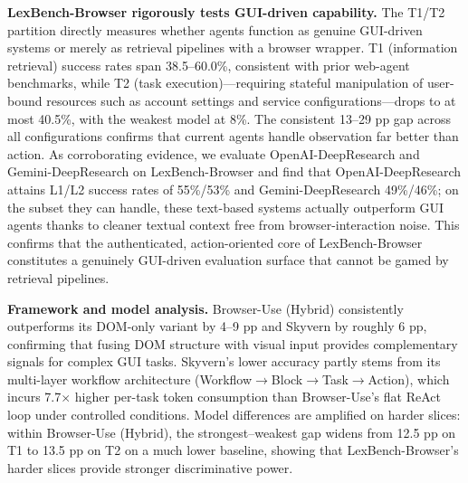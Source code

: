 
\noindent \textbf{LexBench-Browser rigorously tests GUI-driven capability.} The
  T1/T2 partition directly measures whether agents function as
  genuine GUI-driven systems or merely as retrieval pipelines with
  a browser wrapper. T1 (information retrieval) success rates
  span 38.5--60.0\%, consistent with prior web-agent benchmarks,
  while T2 (task execution)---requiring stateful manipulation of
  user-bound resources such as account settings and service
  configurations---drops to at most 40.5\%, with the weakest model at
  8\%. The consistent 13--29 pp gap across all configurations
  confirms that current agents handle observation far better than
  action. As corroborating evidence, we evaluate
  OpenAI-DeepResearch and Gemini-DeepResearch on LexBench-Browser
  and find that OpenAI-DeepResearch attains L1/L2 success rates of
  55\%/53\% and Gemini-DeepResearch 49\%/46\%; on the subset they
  can handle, these text-based systems actually outperform GUI
  agents thanks to cleaner textual context free from
  browser-interaction noise. This confirms that
  the authenticated, action-oriented core of LexBench-Browser
  constitutes a genuinely GUI-driven evaluation surface that
  cannot be gamed by retrieval pipelines.

\noindent \textbf{Framework and model analysis.} Browser-Use (Hybrid) consistently
  outperforms its DOM-only variant by 4--9 pp and Skyvern by
  roughly 6 pp, confirming that fusing DOM structure with visual input
  provides complementary signals for complex GUI tasks. Skyvern's
  lower accuracy partly stems from its multi-layer workflow
  architecture (Workflow$\to$Block$\to$Task$\to$Action), which incurs
  7.7$\times$ higher per-task token consumption than Browser-Use's
  flat ReAct loop under controlled conditions. Model differences
  are amplified on harder slices: within Browser-Use (Hybrid), the
  strongest--weakest gap widens from 12.5 pp on T1 to 13.5 pp on
  T2 on a much lower baseline, showing that LexBench-Browser's
  harder slices provide stronger discriminative power.


